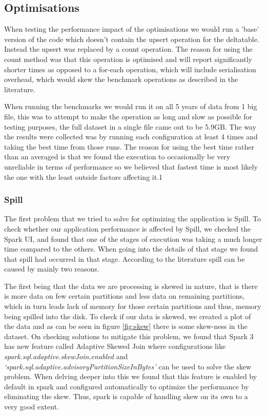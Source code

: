 \subsection{Optimisations}
When testing the performance impact of the optimisations we would run a 'base' version of the code which doesn't contain the upsert operation for the deltatable. Instead the upsert was replaced by a count operation. The reason for using the count method was that this operation is optimised and will report significantly shorter times as opposed to a for-each operation, which will include serialisation overhead, which would skew the benchmark operations as described in the literature.

When running the benchmarks we would run it on all 5 years of data from 1 big file, this was to attempt to make the operation as long and slow as possible for testing purposes, the full dataset in a single file came out to be 5.9GB. The way the results were collected was by running each configuration at least 4 times and taking the best time from those runs. The reason for using the best time rather than an averaged is that we found the execution to occasionally be very unreliable in terms of performance so we believed that fastest time is most likely the one with the least outside factors affecting it.1


\subsubsection{Spill}
The first problem that we tried to solve for optimizing the application is Spill. To check whether our application performance is affected by Spill, we checked the Spark UI, and found that one of the stages of execution was taking a much longer time compared to the others. When going into the details of that stage we found that spill had occurred in that stage. According to the literature spill can be caused by mainly two reasons.

The first being that the data we are processing is skewed in nature, that is there is more data on few certain partitions and less data on remaining partitions, which in turn leads lack of memory for those certain partitions and thus, memory being spilled into the disk. To check if our data is skewed, we created a plot of the data and as can be seen in figure \ref{fig:skew} there is some skew-ness in the dataset. On checking solutions to mitigate this problem, we found that Spark 3 has new feature called Adaptive Skewed Join where configurations like \emph{spark.sql.adaptive.skewJoin.enabled} and \emph{‘spark.sql.adaptive.advisoryPartitionSizeInBytes’} can be used to solve the skew problem. When delving deeper into this we found that this feature is enabled by default in spark and configured automatically to optimize the performance by eliminating the skew\cite{spark}. Thus, spark is capable of handling skew on its own to a very good extent. 

